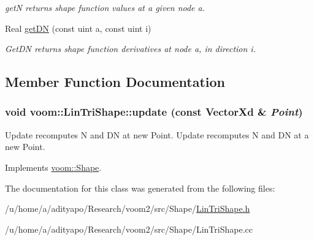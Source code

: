 \begin{DoxyCompactItemize}
\begin{DoxyCompactList}\small\item\em getN returns shape function values at a given node a. \item\end{DoxyCompactList}\item 
\hypertarget{classvoom_1_1_lin_tri_shape_a418e9f637c1178859d422308ef881df7}{
Real \hyperlink{classvoom_1_1_lin_tri_shape_a418e9f637c1178859d422308ef881df7}{getDN} (const uint a, const uint i)}
\label{classvoom_1_1_lin_tri_shape_a418e9f637c1178859d422308ef881df7}

\begin{DoxyCompactList}\small\item\em GetDN returns shape function derivatives at node a, in direction i. \item\end{DoxyCompactList}\end{DoxyCompactItemize}


\subsection{Member Function Documentation}
\hypertarget{classvoom_1_1_lin_tri_shape_a3802bf83a7e1ee9310bdb6d6558bd7ad}{
\subsubsection[{update}]{\setlength{\rightskip}{0pt plus 5cm}void voom::LinTriShape::update (const VectorXd \& {\em Point})}}
\label{classvoom_1_1_lin_tri_shape_a3802bf83a7e1ee9310bdb6d6558bd7ad}


Update recomputes N and DN at new Point. Update recomputes N and DN at a new Point. 

Implements \hyperlink{classvoom_1_1_shape_a8ded544de12647543b056cec61be9f26}{voom::Shape}.

The documentation for this class was generated from the following files:\begin{DoxyCompactItemize}
\item 
/u/home/a/adityapo/Research/voom2/src/Shape/\hyperlink{_lin_tri_shape_8h}{LinTriShape.h}\item 
/u/home/a/adityapo/Research/voom2/src/Shape/LinTriShape.cc\end{DoxyCompactItemize}
